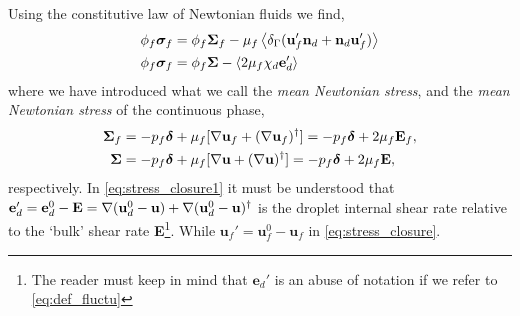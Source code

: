 Using the constitutive law of Newtonian fluids we find, 
\begin{align}
    \phi_f \bm\sigma_f 
    &=
    \phi_f \bm\Sigma_f
    - \mu_f \avg{\delta_\Gamma( \textbf{u}_f'  \textbf{n}_d +  \textbf{n}_d \textbf{u}_f' )}
    \label{eq:stress_closure}\\
    \phi_f \bm\sigma_f 
    &=
    \phi_f \bm\Sigma
    - \avg{2\mu_f \chi_d \textbf{e}_d'}
    \label{eq:stress_closure1}
\end{align}
where we have introduced what we call the \textit{mean Newtonian stress}, and the \textit{mean Newtonian stress} of the continuous phase, 
\begin{align}
    \bm\Sigma_f &= -p_f \bm\delta + \mu_f [\mathbf{\nabla} \textbf{u}_f + (\mathbf{\nabla} \textbf{u}_f)^{\dagger}] = -p_f \bm\delta + 2\mu_f \textbf{E}_f,    \\
    \bm\Sigma &= -p_f \bm\delta + \mu_f [\mathbf{\nabla} \textbf{u} + (\mathbf{\nabla} \textbf{u})^{\dagger}] = -p_f\bm\delta + 2 \mu_f \textbf{E},
\end{align}
respectively. 
In \ref{eq:stress_closure1} it must be understood that $\textbf{e}_d' = \textbf{e}_d^0 - \textbf{E} = \mathbf{\nabla} (\textbf{u}_d^0-\textbf{u})+\mathbf{\nabla} (\textbf{u}_d^0-\textbf{u})^\dagger$ is the droplet internal shear rate relative to the `bulk' shear rate \textbf{E}\footnote{The reader must keep in mind that $\textbf{e}_d'$ is an abuse of notation if we refer to \ref{eq:def_fluctu}}.
While $\textbf{u}_f' = \textbf{u}_f^0 - \textbf{u}_f$ in \ref{eq:stress_closure}. 



